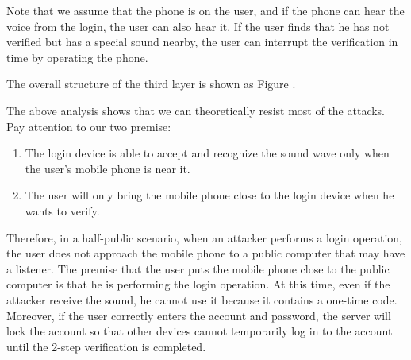 Note that we assume that the phone is on the user, and if the phone can hear the voice from the login, the user can also hear it. If the user finds that he has not verified but has a special sound nearby, the user can interrupt the verification in time by operating the phone.




The overall structure of the third layer is shown as Figure \uppercase\expandafter{}.




The above analysis shows that we can theoretically resist most of the attacks. Pay attention to our two premise: 
\begin{enumerate}
\item The login device is able to accept and recognize the sound wave only when the user's mobile phone is near it.
\item The user will only bring the mobile phone close to the login device when he wants to verify.
\end{enumerate}




Therefore, in a half-public scenario, when an attacker performs a login operation, the user does not approach the mobile phone to a public computer that may have a listener. The premise that the user puts the mobile phone close to the public computer is that he is performing the login operation. At this time, even if the attacker receive the sound, he cannot use it because it contains a one-time code. Moreover, if the user correctly enters the account and password, the server will lock the account so that other devices cannot temporarily log in to the account until the 2-step verification is completed.
